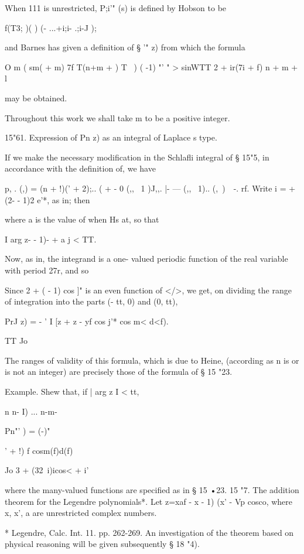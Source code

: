 {{{%
%

When 111 is unrestricted, P;i'" (s) is defined by Hobson to be

f(T3; )( ) (- ...+i;i- .;i-J );

and Barnes has given a definition of § '" z) from which the formula

O m ( sm( + m) 7f T(n+m + ) T \ ) ( -1) "' " > sinWTT 2 + ir(7i + f) n
+ m + l

may be obtained.

Throughout this work we shall take m to be a positive integer.

15"61. Expression of Pn z) as an integral of Laplace s type.

If we make the necessary modification in the Schlafli integral of §
15"5, in accordance with the definition of, we have

p, . (,) = (n + !)(' + 2);.. ( + - 0 (,, \ 1 )J,,. |- --- (,, \ 1)..
(, \,)\ \ -. rf. Write i = + (2- - 1)2 e'*, as in; then

where a is the value of when Hs at, so that

I arg z- - 1)- + a j < TT.

Now, as in, the integrand is a one- valued periodic function
of the real variable with period 27r, and so

Since 2 + ( - 1) cos ]" is an even function of </>, we get, on
dividing the range of integration into the parts (- tt, 0) and (0,
tt),

PrJ z) = - ' I [z + z - yf cos j'* cos m< d<f).

TT Jo

The ranges of validity of this formula, which is due to Heine,
(according as n is or is not an integer) are precisely those of the
formula of § 15 "23.

Example. Shew that, if | arg z I < tt,

n n- I) ... n-m-

Pn"' ) = (-)"

' + !) f cosm(f)d(f)

Jo 3 + (32\ i)icos< + i'

where the many-valued functions are specified as in § 15 •23. 15 "7.
The addition theorem for the Legendre polynomials*. Let z=xaf - x - 1)
(x' - Vp cosco, where x, x', a are unrestricted complex numbers.

* Legendre, Calc. Int. 11. pp. 262-269. An investigation of the
theorem based on physical reasoning will be given subsequently § 18
"4).

}}}
